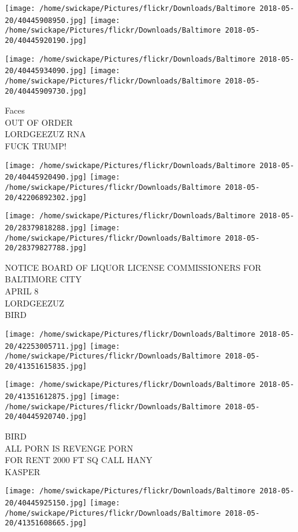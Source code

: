 \documentclass[10pt,letterpaper]{article}
\begin{document}
\texttt{[image: /home/swickape/Pictures/flickr/Downloads/Baltimore 2018-05-20/40445908950.jpg]}
\texttt{[image: /home/swickape/Pictures/flickr/Downloads/Baltimore 2018-05-20/40445920190.jpg]}

\texttt{[image: /home/swickape/Pictures/flickr/Downloads/Baltimore 2018-05-20/40445934090.jpg]}
\texttt{[image: /home/swickape/Pictures/flickr/Downloads/Baltimore 2018-05-20/40445909730.jpg]}

Faces\\
OUT OF ORDER\\
LORDGEEZUZ RNA\\
FUCK TRUMP!\\
\pagebreak

\texttt{[image: /home/swickape/Pictures/flickr/Downloads/Baltimore 2018-05-20/40445920490.jpg]}
\texttt{[image: /home/swickape/Pictures/flickr/Downloads/Baltimore 2018-05-20/42206892302.jpg]}

\texttt{[image: /home/swickape/Pictures/flickr/Downloads/Baltimore 2018-05-20/28379818288.jpg]}
\texttt{[image: /home/swickape/Pictures/flickr/Downloads/Baltimore 2018-05-20/28379827788.jpg]}

NOTICE BOARD OF LIQUOR LICENSE COMMISSIONERS FOR BALTIMORE CITY\\
APRIL 8\\
LORDGEEZUZ\\
BIRD\\
\pagebreak

\texttt{[image: /home/swickape/Pictures/flickr/Downloads/Baltimore 2018-05-20/42253005711.jpg]}
\texttt{[image: /home/swickape/Pictures/flickr/Downloads/Baltimore 2018-05-20/41351615835.jpg]}

\texttt{[image: /home/swickape/Pictures/flickr/Downloads/Baltimore 2018-05-20/41351612875.jpg]}
\texttt{[image: /home/swickape/Pictures/flickr/Downloads/Baltimore 2018-05-20/40445920740.jpg]}

BIRD\\
ALL PORN IS REVENGE PORN\\
FOR RENT 2000 FT SQ CALL HANY\\
KASPER\\
\pagebreak

\texttt{[image: /home/swickape/Pictures/flickr/Downloads/Baltimore 2018-05-20/40445925150.jpg]}
\texttt{[image: /home/swickape/Pictures/flickr/Downloads/Baltimore 2018-05-20/41351608665.jpg]}
\end{document}
